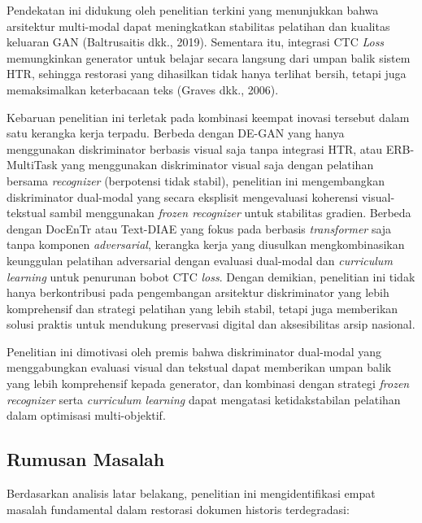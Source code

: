 \documentclass[12pt,a4paper]{article}
\begin{document}
\vspace{0.8em}
Pendekatan ini didukung oleh penelitian terkini yang menunjukkan bahwa arsitektur multi-modal dapat meningkatkan stabilitas pelatihan dan kualitas keluaran GAN (Baltrusaitis dkk., 2019). Sementara itu, integrasi CTC \textit{Loss} memungkinkan generator untuk belajar secara langsung dari umpan balik sistem HTR, sehingga restorasi yang dihasilkan tidak hanya terlihat bersih, tetapi juga memaksimalkan keterbacaan teks (Graves dkk., 2006).

\vspace{0.8em}
Kebaruan penelitian ini terletak pada kombinasi keempat inovasi tersebut dalam satu kerangka kerja terpadu. Berbeda dengan DE-GAN yang hanya menggunakan diskriminator berbasis visual saja tanpa integrasi HTR, atau ERB-MultiTask yang menggunakan diskriminator visual saja dengan pelatihan bersama \textit{recognizer} (berpotensi tidak stabil), penelitian ini mengembangkan diskriminator dual-modal yang secara eksplisit mengevaluasi koherensi visual-tekstual sambil menggunakan \textit{frozen recognizer} untuk stabilitas gradien. Berbeda dengan DocEnTr atau Text-DIAE yang fokus pada berbasis \textit{transformer} saja tanpa komponen \textit{adversarial}, kerangka kerja yang diusulkan mengkombinasikan keunggulan  pelatihan adversarial dengan evaluasi dual-modal dan \textit{curriculum learning} untuk penurunan bobot CTC \textit{loss}. Dengan demikian, penelitian ini tidak hanya berkontribusi pada pengembangan arsitektur diskriminator yang lebih komprehensif dan strategi pelatihan yang lebih stabil, tetapi juga memberikan solusi praktis untuk mendukung preservasi digital dan aksesibilitas arsip nasional.

\vspace{0.8em}
Penelitian ini dimotivasi oleh premis bahwa diskriminator dual-modal yang menggabungkan evaluasi visual dan tekstual dapat memberikan umpan balik yang lebih komprehensif kepada generator, dan kombinasi dengan strategi \textit{frozen recognizer} serta \textit{curriculum learning} dapat mengatasi ketidakstabilan pelatihan dalam optimisasi multi-objektif.
\vspace{0.8em}
\subsection{Rumusan Masalah}
\label{subsec:rumusan-masalah}

Berdasarkan analisis latar belakang, penelitian ini mengidentifikasi empat masalah fundamental dalam restorasi dokumen historis terdegradasi:
\end{document}
